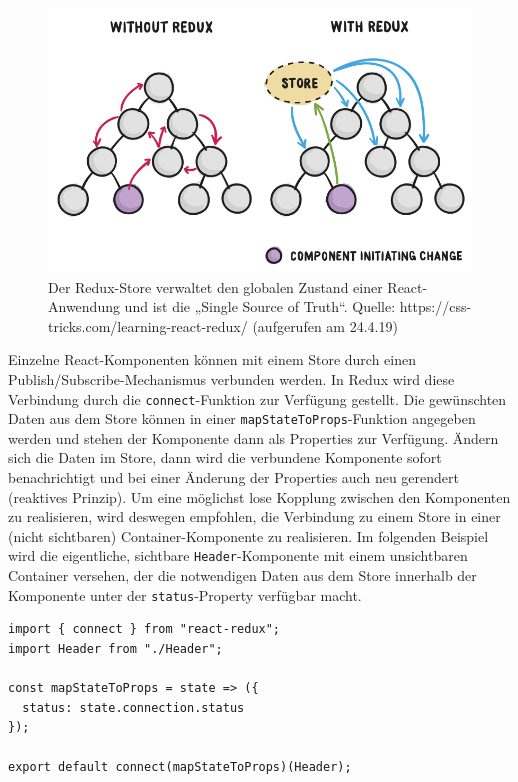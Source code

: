 \begin{figure}[H]
    \includegraphics[width=12cm]{chapter/entwurf/bilder/BA_redux.png}
    \centering
    \caption{Der Redux-Store verwaltet den globalen Zustand einer React-Anwendung und ist die „Single Source of Truth“. Quelle: https://css-tricks.com/learning-react-redux/ (aufgerufen am 24.4.19)}
    \label{abb:redux_flow}
\end{figure}


Einzelne React-Komponenten können mit einem Store durch einen Publish/Subscribe-Mechanismus verbunden werden. In Redux wird diese Verbindung durch die \texttt{connect}-Funktion zur Verfügung gestellt. Die gewünschten Daten aus dem Store können in einer \texttt{mapStateToProps}-Funktion angegeben werden und stehen der Komponente dann als Properties zur Verfügung. Ändern sich die Daten im Store, dann wird die verbundene Komponente sofort benachrichtigt und bei einer Änderung der Properties auch neu gerendert (reaktives Prinzip). Um eine möglichst lose Kopplung zwischen den Komponenten zu realisieren, wird deswegen empfohlen, die Verbindung zu einem Store in einer (nicht sichtbaren) Container-Komponente zu realisieren. Im folgenden Beispiel wird die eigentliche, sichtbare \texttt{Header}-Komponente mit einem unsichtbaren Container versehen, der die notwendigen Daten aus dem Store innerhalb der Komponente unter der \texttt{status}-Property verfügbar macht.

\begin{minipage}{\linewidth}
\begin{lstlisting}[caption={Über den connect-Aufruf beim Exportieren der Komponente wird sie mit dem Store verbunden. (aus:  src/client/components/ClientHeaderContainer.js)}]
import { connect } from "react-redux";
import Header from "./Header";

const mapStateToProps = state => ({
  status: state.connection.status
});

export default connect(mapStateToProps)(Header);
\end{lstlisting}
\end{minipage}

